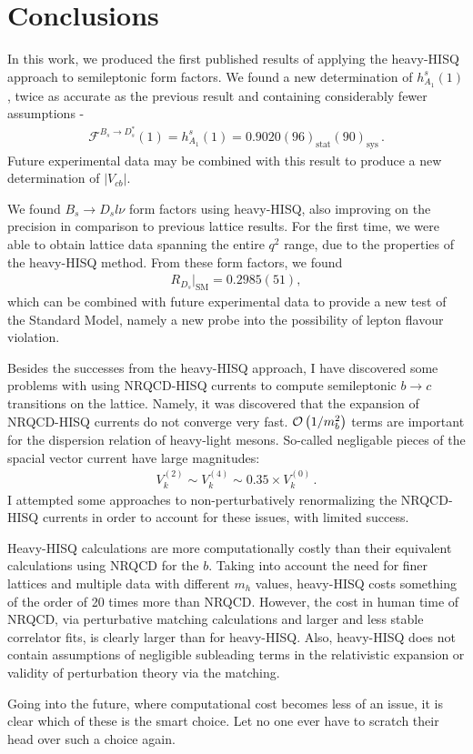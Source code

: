 ﻿\chapter{Conclusions}

In this work, we produced the first published results of applying the heavy-HISQ approach to semileptonic form factors. We found a new determination of $h_{A_1}^s(1)$, twice as accurate as the previous result and containing considerably fewer assumptions -
\begin{align}
  \mathcal{F}^{B_s\to D_s^*}(1) = h^s_{A_1}(1) = 0.9020(96)_{\text{stat}}(90)_{\text{sys}}\,.
\end{align}
Future experimental data may be combined with this result to produce a new determination of $|V_{cb}|$.

We found $B_s\to D_sl\nu$ form factors using heavy-HISQ, also improving on the precision in comparison to previous lattice results. For the first time, we were able to obtain lattice data spanning the entire $q^2$ range, due to the properties of the heavy-HISQ method. From these form factors, we found
\begin{align}
  R_{D_s}|_{\text{SM}} = 0.2985(51),
\end{align}
which can be combined with future experimental data to provide a new test of the Standard Model, namely a new probe into the possibility of lepton flavour violation.

Besides the successes from the heavy-HISQ approach, I have discovered some problems with using NRQCD-HISQ currents to compute semileptonic $b\to c$ transitions on the lattice. Namely, it was discovered that the expansion of NRQCD-HISQ currents do not converge very fast. $\mathcal{O}\left( 1/m_b^2 \right)$ terms are important for the dispersion relation of heavy-light mesons. So-called negligable pieces of the spacial vector current have large magnitudes:
\begin{align}
  V_k^{(2)}\sim V_k^{(4)} \sim 0.35\times V_k^{(0)}\,.
\end{align}
I attempted some approaches to non-perturbatively renormalizing the NRQCD-HISQ currents in order to account for these issues, with limited success. 


Heavy-HISQ calculations are more computationally costly than their equivalent calculations using NRQCD for the $b$. Taking into account the need for finer lattices and multiple data with different $m_h$ values, heavy-HISQ costs something of the order of 20 times more than NRQCD. However, the cost in human time of NRQCD, via perturbative matching calculations and larger and less stable correlator fits, is clearly larger than for heavy-HISQ. Also, heavy-HISQ does not contain assumptions of negligible subleading terms in the relativistic expansion or validity of perturbation theory via the matching.

Going into the future, where computational cost becomes less of an issue, it is clear which of these is the smart choice. Let no one ever have to scratch their head over such a choice again.
